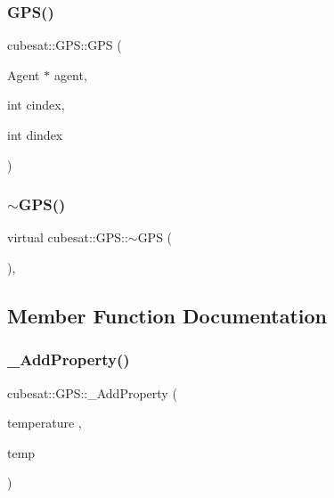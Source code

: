 \subsubsection{\texorpdfstring{G\+P\+S()}{GPS()}}
{\footnotesize\ttfamily cubesat\+::\+G\+P\+S\+::\+G\+PS (\begin{DoxyParamCaption}\item[{Agent $\ast$}]{agent,  }\item[{int}]{cindex,  }\item[{int}]{dindex }\end{DoxyParamCaption})\hspace{0.3cm}{\ttfamily [inline]}}

\mbox{\label{classcubesat_1_1GPS_a85ee6eba278200dddd5587c4cf2944fd}} 
\subsubsection{\texorpdfstring{$\sim$\+G\+P\+S()}{~GPS()}}
{\footnotesize\ttfamily virtual cubesat\+::\+G\+P\+S\+::$\sim$\+G\+PS (\begin{DoxyParamCaption}{ }\end{DoxyParamCaption})\hspace{0.3cm}{\ttfamily [inline]}, {\ttfamily [virtual]}}



\subsection{Member Function Documentation}
\mbox{\label{classcubesat_1_1GPS_ad360460187cc59936dd5b3be9e910cf3}} 
\subsubsection{\texorpdfstring{\+\_\+\+Add\+Property()}{\_AddProperty()}\hspace{0.1cm}{\footnotesize\ttfamily [1/9]}}
{\footnotesize\ttfamily cubesat\+::\+G\+P\+S\+::\+\_\+\+Add\+Property (\begin{DoxyParamCaption}\item[{temperature}]{,  }\item[{temp}]{ }\end{DoxyParamCaption})}

